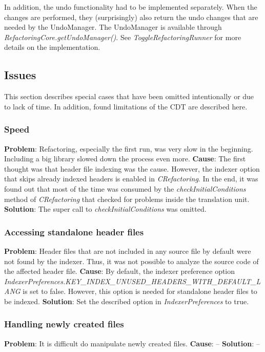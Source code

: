 In addition, the undo functionality had to be implemented separately. When the 
changes are performed, they (surprisingly) also return the undo changes that are 
needed by the UndoManager. The UndoManager is available through 
\textit{RefactoringCore.getUndoManager()}. See \textit{ToggleRefactoringRunner} 
for more details on the implementation.

\subsection{Issues}

This section describes special cases that have been omitted intentionally or due 
to lack of time. In addition, found limitations of the CDT are described here.

\subsubsection{Speed}
\textbf{Problem}: Refactoring, especially the first run, was very slow in the 
beginning. Including a big library slowed down the process even more.
\textbf{Cause}: The first thought was that header file indexing was the cause. 
However, the indexer option that skips already indexed headers is enabled in 
\textit{CRefactoring}. In the end, it was found out that most of the time was 
consumed by the \textit{checkInitialConditions} method of \textit{CRefactoring} 
that checked for problems inside the translation unit.
\textbf{Solution}: The super call to \textit{checkInitialConditions} was omitted.

\subsubsection{Accessing standalone header files}
\textbf{Problem}: Header files that are not included in any source file by 
default were not found by the indexer. Thus, it was not possible to analyze the 
source code of the affected header file.
\textbf{Cause}: By default, the indexer preference option 
\textit{IndexerPreferences.KEY\_INDEX\_UNUSED\_HEADERS\_WITH\_DEFAULT\_LANG} is 
set to false. However, this option is needed for standalone header files to be 
indexed.
\textbf{Solution}: Set the described option in \textit{IndexerPreferences} to 
true.

\subsubsection{Handling newly created files}
\textbf{Problem}: It is difficult do manipulate newly created files.
\textbf{Cause}: --
\textbf{Solution}: --

